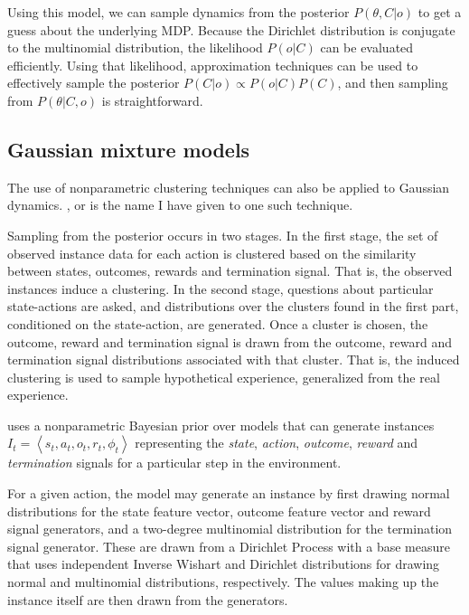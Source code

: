 Using this model, we can sample dynamics from the posterior $P(\theta, C|o)$ to get a guess about the underlying MDP. Because the Dirichlet distribution is conjugate to the multinomial distribution, the likelihood $P(o|C)$ can be evaluated efficiently. Using that likelihood, approximation techniques can be used to effectively sample the posterior $P(C|o)\propto P(o|C)P(C)$, and then sampling from $P(\theta|C,o)$ is straightforward. 

\subsection{Gaussian mixture models}

The use of nonparametric clustering techniques can also be applied to Gaussian dynamics. , or  is the name I have given to one such technique.

Sampling from the  posterior occurs in two stages. In the first stage, the set of observed instance data for each action is clustered based on the similarity between states, outcomes, rewards and termination signal. That is, the observed instances induce a clustering. In the second stage, questions about particular state-actions are asked, and distributions over the clusters found in the first part, conditioned on the state-action, are generated. Once a cluster is chosen, the outcome, reward and termination signal is drawn from the outcome, reward and termination signal distributions associated with that cluster. That is, the induced clustering is used to sample hypothetical experience, generalized from the real experience.

 uses a nonparametric Bayesian prior over models that can generate instances $I_t=\left<s_t, a_t, o_t, r_t, \phi_t\right>$ representing the \emph{state}, \emph{action}, \emph{outcome}, \emph{reward} and \emph{termination} signals for a particular step in the environment.

For a given action, the model may generate an instance by first drawing normal distributions for the state feature vector, outcome feature vector and reward signal generators, and a two-degree multinomial distribution for the termination signal generator. These are drawn from a Dirichlet Process with a base measure that uses independent Inverse Wishart and Dirichlet distributions for drawing normal and multinomial distributions, respectively. The values making up the instance itself are then drawn from the generators.

